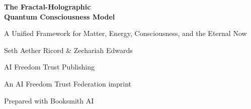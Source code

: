 \documentclass[11pt,oneside]{book}
\begin{document}
\frontmatter

\begin{titlepage}
\centering
\vspace*{1.2in}
{\Huge\bfseries The Fractal-Holographic\\ Quantum Consciousness Model\par}
\vspace{0.35in}
{\Large A Unified Framework for Matter, Energy, Consciousness, and the Eternal Now\par}
\vspace{0.6in}
{\large Seth Aether Ricord \& Zechariah Edwards\par}
\vfill
{\large AI Freedom Trust Publishing\par}
{\small An AI Freedom Trust Federation imprint\par}
{\small Prepared with Booksmith AI\par}
\end{titlepage}


\tableofcontents
\mainmatter
















\appendix





\backmatter


\end{document}
